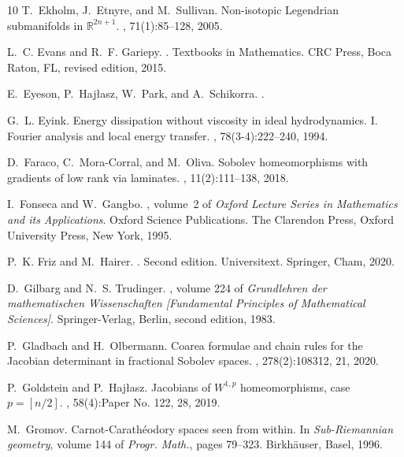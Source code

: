 \documentclass[intlimits,12pt,reqno]{amsart}
\numberwithin{equation}{section}
\theoremstyle{definition}
\begin{document}
\begin{thebibliography}{10}
T.~Ekholm, J.~Etnyre, and M.~Sullivan.
\newblock Non-isotopic {L}egendrian submanifolds in {$\mathbb{R}^{2n+1}$}.
, 71(1):85--128, 2005.

L.~C. Evans and R.~F. Gariepy.
.
\newblock Textbooks in Mathematics. CRC Press, Boca Raton, FL, revised edition,
  2015.

E.~Eyeson, P.~Haj\l{}asz, W.~{Park}, and A.~{Schikorra}.
.

G.~L. Eyink.
\newblock Energy dissipation without viscosity in ideal hydrodynamics. {I}.
  {F}ourier analysis and local energy transfer.
, 78(3-4):222--240, 1994.

D.~Faraco, C.~Mora-Corral, and M.~Oliva.
\newblock Sobolev homeomorphisms with gradients of low rank via laminates.
, 11(2):111--138, 2018.

I.~Fonseca and W.~Gangbo.
, volume~2 of {\em
  Oxford Lecture Series in Mathematics and its Applications}.
\newblock Oxford Science Publications.
\newblock The Clarendon Press, Oxford University Press, New York, 1995.

P.~K. Friz and M.~Hairer.
.
\newblock Second edition.
\newblock Universitext. Springer, Cham, 2020.


D.~Gilbarg and N.~S. Trudinger.
, volume
  224 of {\em Grundlehren der mathematischen Wissenschaften [Fundamental
  Principles of Mathematical Sciences]}.
\newblock Springer-Verlag, Berlin, second edition, 1983.

P.~Gladbach and H.~Olbermann.
\newblock Coarea formulae and chain rules for the {J}acobian determinant in
  fractional {S}obolev spaces.
, 278(2):108312, 21, 2020.

P.~Goldstein and P.~Haj\l{}asz.
\newblock Jacobians of {$W^{1,p}$} homeomorphisms, case {$p=[n/2]$}.
, 58(4):Paper No. 122,
  28, 2019.

M.~Gromov.
\newblock Carnot-{C}arath\'{e}odory spaces seen from within.
\newblock In {\em Sub-{R}iemannian geometry}, volume 144 of {\em Progr. Math.},
  pages 79--323. Birkh\"{a}user, Basel, 1996.


\end{thebibliography}
\end{document}
